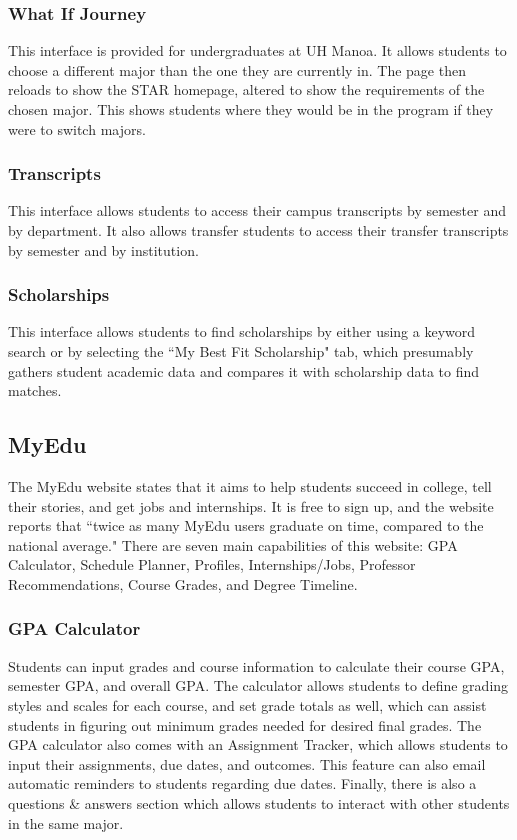 \subsubsection{What If Journey}
This interface is provided for undergraduates at UH Manoa. It allows students to choose a different major than the one they are currently in. The page then reloads to show the STAR homepage, altered to show the requirements of the chosen major. This shows students where they would be in the program if they were to switch majors.
\subsubsection{Transcripts}
This interface allows students to access their campus transcripts by semester and by department. It also allows transfer students to access their transfer transcripts by semester and by institution. 
\subsubsection{Scholarships}
This interface allows students to find scholarships by either using a keyword search or by selecting the ``My Best Fit Scholarship" tab, which presumably gathers student academic data and compares it with scholarship data to find matches.

\subsection{MyEdu} 
The MyEdu website states that it aims to help students succeed in college, tell their stories, and get jobs and internships. It is free to sign up, and the website reports that ``twice as many MyEdu users graduate on time, compared to the national average." There are seven main capabilities of this website: GPA Calculator, Schedule Planner, Profiles, Internships/Jobs, Professor Recommendations, Course Grades, and Degree Timeline.
\subsubsection{GPA Calculator}
Students can input grades and course information to calculate their course GPA, semester GPA, and overall GPA. The calculator allows students to define grading styles and scales for each course, and set grade totals as well, which can assist students in figuring out minimum grades needed for desired final grades. The GPA calculator also comes with an Assignment Tracker, which allows students to input their assignments, due dates, and outcomes. This feature can also email automatic reminders to students regarding due dates. Finally, there is also a questions \& answers section which allows students to interact with other students in the same major. 
